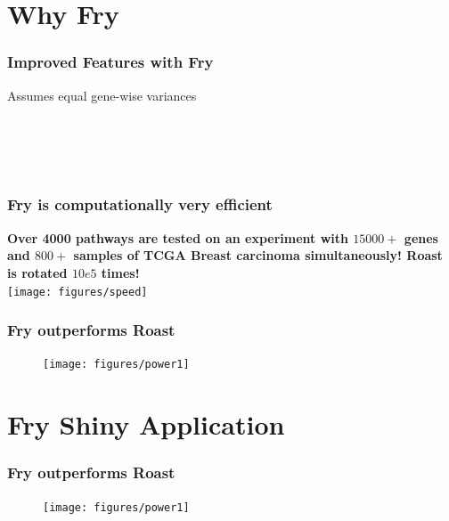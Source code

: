 \documentclass[9pt,t]{beamer}
\begin{document}
\section{Why Fry}
\begin{frame}
\frametitle{Improved Features with Fry}
Assumes equal gene-wise variances\\
\vfill
  \\
\vfill
  \\
\vfill
{}\\
\vfill
{}\\
\vfill
{}
\end{frame}

\begin{frame}
\frametitle{Fry is computationally very efficient}
\vfill
\large\textbf{\color{oxygenpurple}Over 4000 pathways are tested on an experiment with $15000+$ genes and $800+$ samples of TCGA Breast carcinoma simultaneously! Roast is rotated $10e5$ times!}\\
\vfill
\texttt{[image: figures/speed]}
\end{frame}

\begin{frame}
\frametitle{Fry outperforms Roast}
\begin{figure}
\texttt{[image: figures/power1]}
\end{figure}
\end{frame}

\section{Fry Shiny Application}
\begin{frame}
\frametitle{Fry outperforms Roast}
\begin{figure}
\texttt{[image: figures/power1]}
\end{figure}
\end{frame}
\end{document}
